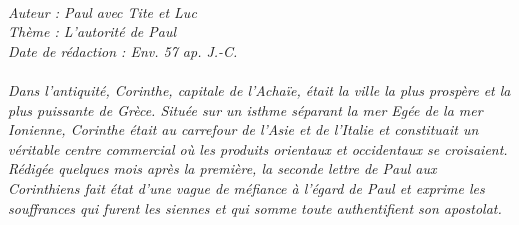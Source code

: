 \BFont
\noindent\hrulefill
{\footnotesize
\textit{
\bigskip
{\centering{}
\\Auteur : Paul avec Tite et Luc
\\Thème : L'autorité de Paul
\\Date de rédaction : Env. 57 ap. J.-C.\\}
}
\textit{
\\Dans l’antiquité, Corinthe, capitale de l’Achaïe, était la ville la plus prospère et la plus puissante de Grèce. Située sur
un isthme séparant la mer Egée de la mer Ionienne, Corinthe était au carrefour de l’Asie et de l’Italie et constituait un
véritable centre commercial où les produits orientaux et occidentaux se croisaient.
\\Rédigée quelques mois après la première, la seconde lettre de Paul aux Corinthiens fait état d’une vague de méfiance à l’égard de Paul et exprime les souffrances qui furent les siennes et qui somme toute authentifient son apostolat.\bigskip
}
}
\par\nobreak\noindent\hrulefill
